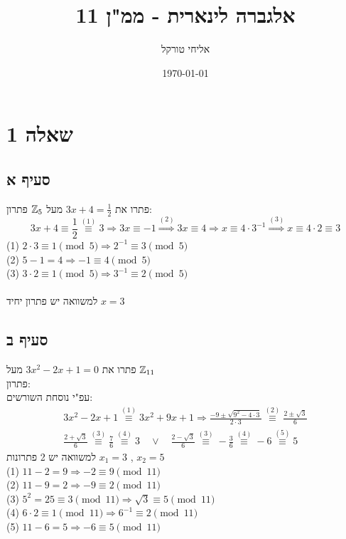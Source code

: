 \documentclass{article}
\title{אלגברה לינארית - ממ"ן 11}
\author{אליחי טורקל \ID}
\date\today
\begin{document}
	\maketitle %

	\section*{שאלה 1}

	\subsection*{סעיף א}
	פתרו את $3x + 4 = \frac{1}{2}$ מעל $\mathbb{Z}_5$
	פתרון:
	\[
		3x + 4 \equiv \frac{1}{2} \overset{(1)}\equiv
		3 \Rightarrow
		3x \equiv -1 \overset{(2)}\Rightarrow
		3x \equiv 4 \Rightarrow
		x \equiv 4 \cdot 3^{-1} \overset{(3)}\Rightarrow
		x \equiv 4 \cdot 2 \equiv 3
	\]
(1) $ 2 \cdot 3 \equiv 1 \pmod 5 \Rightarrow 2^{-1} \equiv 3 \pmod 5$ \\
(2) $ 5 - 1 = 4 \Rightarrow -1 \equiv 4 \pmod 5$ \\
(3) $ 3 \cdot 2 \equiv 1 \pmod 5 \Rightarrow 3^{-1} \equiv 2 \pmod 5$ \\ \\
למשוואה יש פתרון יחיד $x = 3$

\subsection*{סעיף ב}
פתרו את $3x^2 - 2x + 1 = 0$ מעל $\mathbb{Z}_{11}$ \\
פתרון: \\
עפ"י נוסחת השורשים:
\begin{align*}
	3x^2 - 2x + 1 \overset{(1)}\equiv
	3x^2 + 9x + 1 \Rightarrow
	\frac{-9 \pm \sqrt{9^2-4 \cdot 3}}{2 \cdot 3}
	\overset{(2)}\equiv \frac{2 \pm \sqrt{3}}{6} \\[1em]
	\frac{2 + \sqrt{3}}{6} \overset{(3)}\equiv
	\frac{7}{6} \overset{(4)}\equiv 3
	\quad \lor \quad
	\frac{2 - \sqrt{3}}{6} \overset{(3)}\equiv
	-\frac{3}{6} \overset{(4)}\equiv -6
	\overset{(5)}\equiv 5
\end{align*}
למשוואה יש 2 פתרונות $x_1 = 3$ , $x_2 = 5$ \\

\noindent
(1) $ 11 - 2 = 9 \Rightarrow -2 \equiv 9 \pmod{11}$ \\
(2) $ 11 - 9 = 2 \Rightarrow -9 \equiv 2 \pmod{11}$ \\
(3) $ 5^2 = 25 \equiv 3 \pmod{11} \Rightarrow \sqrt{3} \equiv 5 \pmod{11}$ \\
(4) $ 6 \cdot 2 \equiv 1 \pmod{11} \Rightarrow 6^{-1} \equiv 2 \pmod{11}$ \\
(5) $ 11 - 6 = 5 \Rightarrow -6 \equiv 5 \pmod{11}$
\end{document}
